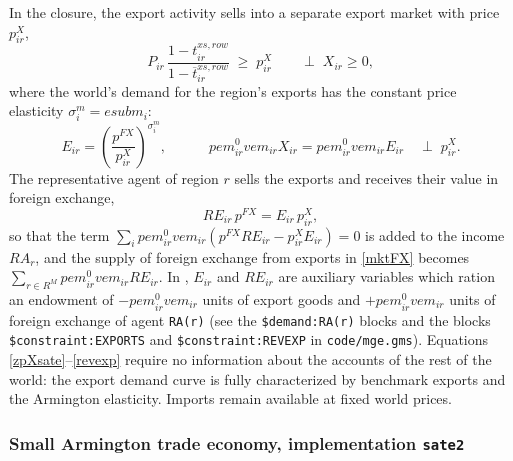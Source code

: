 In the \SATE closure, the export activity sells into a separate export market with price $p^X_{ir}$,
\begin{equation}\label{zpXsate}
P_{ir}\,\frac{1-t^{xs,row}_{ir}}{1-\overline{t}^{xs,row}_{ir}} \;\geq\; p^X_{ir}
\qquad \perp \; X_{ir}\geq 0,
\end{equation}
where the world's demand for the region's exports has the constant price elasticity $\sigma^m_i=\textit{esubm}_i$:
\begin{equation}\label{exportdemand}
E_{ir} = \left(\frac{p^{FX}}{p^X_{ir}}\right)^{\sigma^m_i},
\qquad\quad
\textit{pem}^0_{ir}\textit{vem}_{ir}X_{ir} = \textit{pem}^0_{ir}\textit{vem}_{ir}E_{ir}
\quad \perp\; p^X_{ir}.
\end{equation}
The representative agent of region $r$ sells the exports and receives their value in foreign exchange,
\begin{equation}\label{revexp}
\mathit{RE}_{ir}\,p^{FX} = E_{ir}\,p^X_{ir},
\end{equation}
so that the term $\sum_i \textit{pem}^0_{ir}\textit{vem}_{ir}\left(p^{FX}\mathit{RE}_{ir}-p^X_{ir}E_{ir}\right)=0$ is added to the income $\mathit{RA}_r$, and the supply of foreign exchange from exports in \eqref{mktFX} becomes $\sum_{r\in R^M}\textit{pem}^0_{ir}\textit{vem}_{ir}\mathit{RE}_{ir}$.
In \MPSGE, $E_{ir}$ and $\mathit{RE}_{ir}$ are auxiliary variables which ration an endowment of $-\textit{pem}^0_{ir}\textit{vem}_{ir}$ units of export goods and $+\textit{pem}^0_{ir}\textit{vem}_{ir}$ units of foreign exchange of agent \texttt{RA(r)} (see the \texttt{\$demand:RA(r)} blocks and the blocks \texttt{\$constraint:EXPORTS} and \texttt{\$constraint:REVEXP} in \texttt{code/mge.gms}).
Equations \eqref{zpXsate}--\eqref{revexp} require no information about the accounts of the rest of the world: the export demand curve is fully characterized by benchmark exports and the Armington elasticity.
Imports remain available at fixed world prices.

\subsubsection{Small Armington trade economy, implementation \texttt{sate2}}

